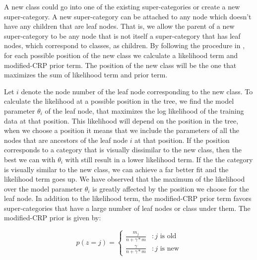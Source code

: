 \documentclass[10pt,twocolumn,letterpaper]{article}
\begin{document}
A new class could go into one of the existing super-categories or create a new super-category. A new super-category 
can be attached to any node which doesn't have any children that are leaf nodes. That is, we allow the parent of a new
super-category to be any node that is not itself a super-category that has leaf nodes, which correspond to classes, as children.
By following the procedure in \cite{ruslan},  for each possible position of the new class we calculate a likelihood term and 
modified-CRP prior term. The position of the new class will be the one that maximizes the sum of likelihood term and  prior term. 

Let $i$ denote the node number of the leaf node corresponding to the new class.   
To calculate the likelihood at a possible position in the tree, we find the model parameter $\theta_{i}$ of the leaf node, 
that maximizes the log likelihood of the training data at that position. This likelihood will depend on the position in the tree, when 
we choose a position it means that we include the parameters of all the nodes that are ancestors of the leaf node $i$ at that position. 
If the position corresponds to a category that is visually dissimilar to the new class, then the best we can with $\theta_{i}$ with still 
result in a lower likelihood term. If the the category is visually similar to the new class, we can achieve a far better fit and the likelihood
term goes up. We have observed that the maximum of the likelihood over the model parameter $\theta_{i}$ is greatly affected by the position
we choose for the leaf node. In addition to the likelihood term, the modified-CRP prior term favors super-categories that have a large number of 
 leaf nodes or class under them. The modified-CRP prior is given by:
 
 \begin{displaymath}
 p(z=j) = \left \{
	    \begin{array}{lr}
 		\frac{m_{j}}{n+\gamma*m} & : \text{$j$ is old} \\
		\frac{\gamma}{n+\gamma*m} & : \text{$j$ is new}
	   \end{array}
	  \right.
 \end{displaymath} 
 
\end{document}
